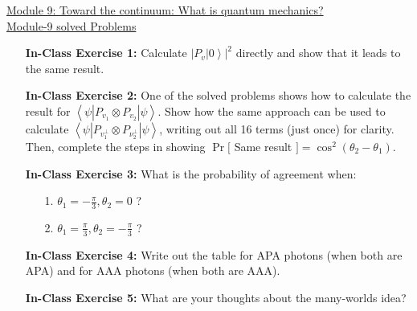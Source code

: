\documentclass[main.tex]{subfiles}
\begin{document}
\href{https://www2.seas.gwu.edu/~simhaweb/quantum/modules/module9/module9.html}{Module 9: Toward the continuum: What is quantum mechanics?}\\
\href{https://www2.seas.gwu.edu/~simhaweb/quantum/modules/module9/problems9.html}{Module-9 solved Problems}

\begin{enumerate}

\item[] \textbf{In-Class Exercise 1:} Calculate $\left.\left|P_{v}\right| 0\right\rangle\left.\right|^{2}$ directly and show that it leads to the same result.

\item[] \textbf{In-Class Exercise 2:} One of the solved problems shows how to calculate the result for $\left\langle\psi\left|P_{v_{1}} \otimes P_{v_{2}}\right| \psi\right\rangle$. Show how the same approach can be used to calculate $\left\langle\psi\left|P_{v_{1}^{\perp}} \otimes P_{\nu_{2}^{\perp}}\right| \psi\right\rangle$, writing out all 16 terms (just once) for clarity. Then, complete the steps in showing
$\operatorname{Pr}[$ Same result $]=\cos ^{2}\left(\theta_{2}-\theta_{1}\right)$.

\item[] \textbf{In-Class Exercise 3:} What is the probability of agreement when:
\begin{enumerate}
    \item[1.] $\theta_{1}=-\frac{\pi}{3}, \theta_{2}=0$ ?
    \item[2.] $\theta_{1}=\frac{\pi}{3}, \theta_{2}=-\frac{\pi}{3}$ ?
\end{enumerate}

\item[] \textbf{In-Class Exercise 4:} Write out the table for APA photons (when both are APA) and for AAA photons (when both are AAA).

\item[] \textbf{In-Class Exercise 5:} What are your thoughts about the many-worlds idea?

\end{enumerate}
\end{document}
